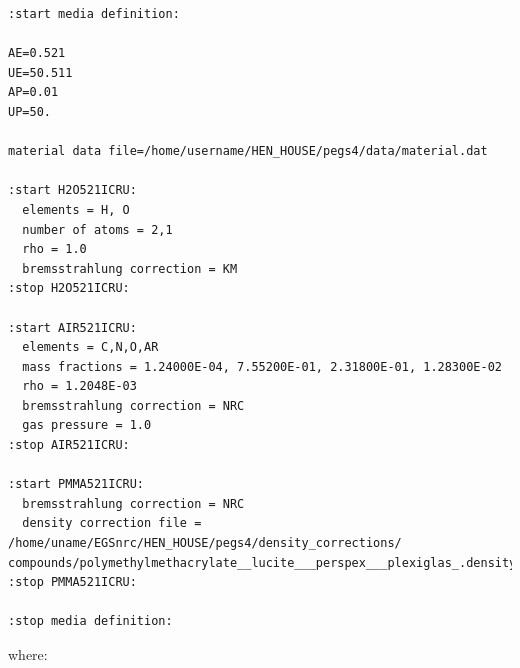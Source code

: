 \documentclass[12pt,twoside]{article}
\begin{document}
\begin{verbatim}
:start media definition:

AE=0.521
UE=50.511
AP=0.01
UP=50.

material data file=/home/username/HEN_HOUSE/pegs4/data/material.dat

:start H2O521ICRU:
  elements = H, O
  number of atoms = 2,1
  rho = 1.0
  bremsstrahlung correction = KM
:stop H2O521ICRU:

:start AIR521ICRU:
  elements = C,N,O,AR
  mass fractions = 1.24000E-04, 7.55200E-01, 2.31800E-01, 1.28300E-02
  rho = 1.2048E-03
  bremsstrahlung correction = NRC
  gas pressure = 1.0
:stop AIR521ICRU:

:start PMMA521ICRU:
  bremsstrahlung correction = NRC
  density correction file = /home/uname/EGSnrc/HEN_HOUSE/pegs4/density_corrections/
compounds/polymethylmethacrylate__lucite___perspex___plexiglas_.density
:stop PMMA521ICRU:

:stop media definition:
\end{verbatim}
where:
\end{document}

